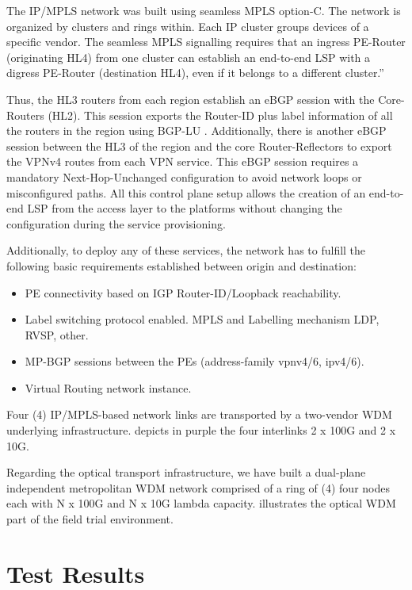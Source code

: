 \documentclass[a4paper,fleqn]{cas-dc}
\begin{document}
The IP/MPLS network was built using seamless MPLS option-C. The network is organized by clusters and rings within. Each IP cluster groups devices of a specific vendor. The seamless MPLS signalling requires that an ingress PE-Router (originating HL4) from one cluster can establish an end-to-end LSP with a digress PE-Router (destination HL4), even if it belongs to a different cluster.”

Thus, the HL3 routers from each region establish an eBGP session with the Core-Routers (HL2). This session exports the Router-ID plus label information of all the routers in the region using BGP-LU \cite{rfc8277}. Additionally, there is another eBGP session between the HL3 of the region and the core Router-Reflectors to export the VPNv4 routes from each VPN service. This eBGP session requires a mandatory Next-Hop-Unchanged configuration to avoid network loops or misconfigured paths. All this control plane setup allows the creation of an end-to-end LSP from the access layer to the platforms without changing the configuration during the service provisioning.

Additionally, to deploy any of these services, the network has to fulfill the following basic requirements established between origin and destination:
\begin{itemize}
    \item PE connectivity based on IGP Router-ID/Loopback reachability.
    \item Label switching protocol enabled. MPLS and Labelling mechanism LDP, RVSP, other. 
    \item MP-BGP sessions between the PEs (address-family vpnv4/6, ipv4/6).
    \item Virtual Routing network instance. 
\end{itemize}

Four (4) IP/MPLS-based network links are transported by a two-vendor WDM underlying infrastructure.  depicts in purple the four interlinks 2 x 100G and 2 x 10G.  

Regarding the optical transport infrastructure, we have built a dual-plane independent metropolitan WDM network comprised of a ring of (4) four nodes each with N x 100G and N x 10G lambda capacity.  illustrates the optical WDM part of the field trial environment.


\section{Test Results}
\label{section:results}
\end{document}
